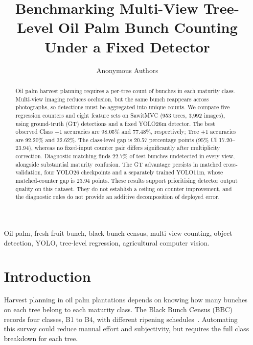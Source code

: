\documentclass[conference,a4paper]{IEEEtran}
\begin{document}
\title{Benchmarking Multi-View Tree-Level Oil Palm Bunch Counting Under a Fixed Detector}

\author{Anonymous Authors}

\maketitle

\begin{abstract}
Oil palm harvest planning requires a per-tree count of bunches in each maturity
class. Multi-view imaging reduces occlusion, but the same bunch reappears across
photographs, so detections must be aggregated into unique counts. We compare
five regression counters and eight feature sets on SawitMVC (953 trees, 3,992
images), using ground-truth (GT) detections and a fixed YOLO26m detector. The
best observed Class $\pm$1 accuracies are 98.05\% and 77.48\%, respectively;
Tree $\pm$1 accuracies are 92.20\% and 32.62\%. The class-level gap is 20.57
percentage points (95\% CI 17.20--23.94), whereas no fixed-input counter pair
differs significantly after multiplicity correction. Diagnostic matching finds
22.7\% of test bunches undetected in every view, alongside substantial maturity
confusion. The GT advantage persists in matched cross-validation, four YOLO26
checkpoints and a separately trained YOLO11m, whose matched-counter gap is
23.94 points. These results support prioritising detector output quality on
this dataset. They do not establish a ceiling on counter improvement, and
the diagnostic rules do not provide an additive decomposition of deployed error.

\end{abstract}
\begin{IEEEkeywords}
Oil palm, fresh fruit bunch, black bunch census, multi-view counting, object
detection, YOLO, tree-level regression, agricultural computer vision.
\end{IEEEkeywords}

\section{Introduction}
Harvest planning in oil palm plantations depends on knowing how many bunches
on each tree belong to each maturity class. The Black Bunch Census (BBC)
records four classes, B1 to B4, with different ripening schedules~\cite{ref12}. Automating this survey could reduce manual effort
and subjectivity, but requires the full class breakdown for each tree.
\end{document}
